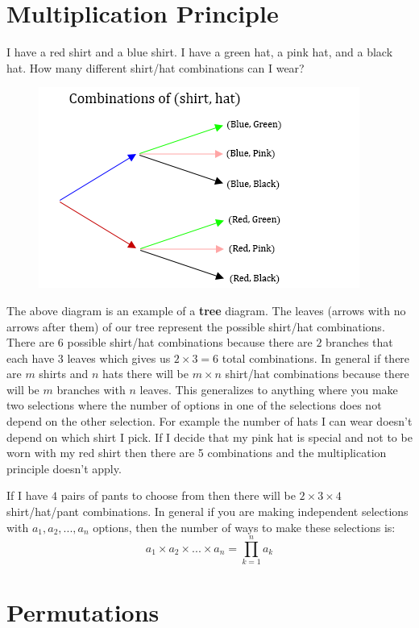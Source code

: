 \documentclass[]{book}
\begin{document}
\section{Multiplication Principle}\label{multiplication-principle}

I have a red shirt and a blue shirt. I have a green hat, a pink hat, and
a black hat. How many different shirt/hat combinations can I wear?

\begin{figure}
\centering
\includegraphics{Pictures/02-Counting/Tree.PNG}
\caption{}
\end{figure}

The above diagram is an example of a \textbf{tree} diagram. The leaves
(arrows with no arrows after them) of our tree represent the possible
shirt/hat combinations. There are \(6\) possible shirt/hat combinations
because there are \(2\) branches that each have \(3\) leaves which gives
us \(2 \times 3 = 6\) total combinations. In general if there are \(m\)
shirts and \(n\) hats there will be \(m \times n\) shirt/hat
combinations because there will be \(m\) branches with \(n\) leaves.
This generalizes to anything where you make two selections where the
number of options in one of the selections does not depend on the other
selection. For example the number of hats I can wear doesn't depend on
which shirt I pick. If I decide that my pink hat is special and not to
be worn with my red shirt then there are 5 combinations and the
multiplication principle doesn't apply.

If I have \(4\) pairs of pants to choose from then there will be
\(2 \times 3 \times 4\) shirt/hat/pant combinations. In general if you
are making independent selections with \(a_1,a_2,...,a_n\) options, then
the number of ways to make these selections is:
\[a_1 \times a_2 \times ... \times a_n=\displaystyle\prod_{k=1}^{n} a_k\]

\section{Permutations}\label{permutations}
\end{document}

